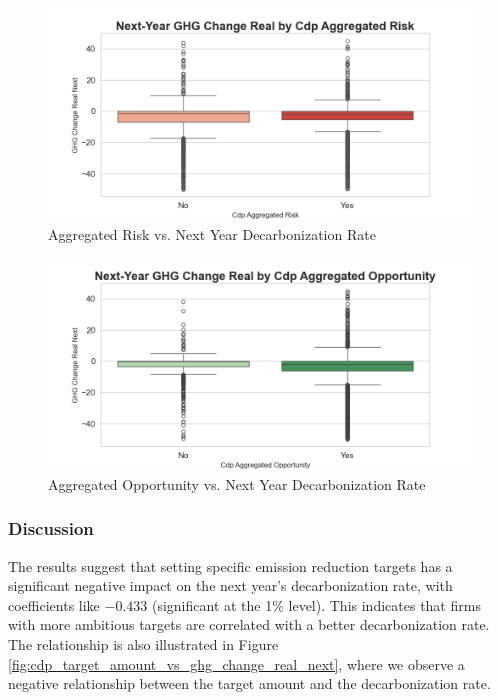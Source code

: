 \begin{figure}[H]
\centering
  \includegraphics[width=\textwidth]{figures/ghg_change_real_next_by_cdp_aggregated_risk.png}
\caption{Aggregated Risk vs. Next Year Decarbonization Rate}
\label{fig:ghg_change_real_next_by_cdp_aggregated_risk}
\end{figure}

\begin{figure}[H]
\centering
  \includegraphics[width=\textwidth]{figures/ghg_change_real_next_by_cdp_aggregated_opportunity.png}
\caption{Aggregated Opportunity vs. Next Year Decarbonization Rate}
\label{fig:ghg_change_real_next_by_cdp_aggregated_opportunity}
\end{figure}


\subsubsection{Discussion}
The results suggest that setting specific emission reduction targets has a significant negative impact on the next year's decarbonization rate, with coefficients like $-0.433$ (significant at the 1\% level). This indicates that firms with more ambitious targets are correlated with a better decarbonization rate. The relationship is also illustrated in Figure \ref{fig:cdp_target_amount_vs_ghg_change_real_next}, where we observe a negative relationship between the target amount and the decarbonization rate. 


